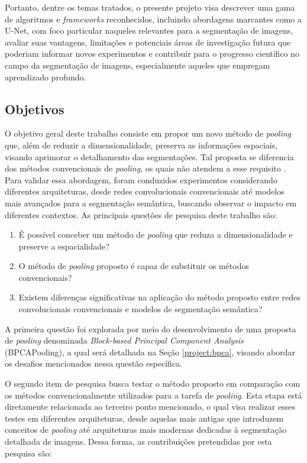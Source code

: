 Portanto, dentre os temas tratados, o presente projeto visa descrever uma gama de algoritmos e \textit{frameworks} reconhecidos, incluindo abordagens marcantes como a U-Net, com foco particular naqueles relevantes para a segmentação de imagens, avaliar suas vantagens, limitações e potenciais áreas de investigação futura que poderiam informar novos experimentos e contribuir para o progresso científico no campo da segmentação de imagens, especialmente aqueles que empregam aprendizado profundo.

\subsection{Objetivos}
\label{intro:objectives}
O objetivo geral deste trabalho consiste em propor um novo método de \textit{pooling} que, além de reduzir a dimensionalidade, preserva as informações espaciais, visando aprimorar o detalhamento das segmentações. Tal proposta se diferencia dos métodos convencionais de \textit{pooling}, os quais não atendem a esse requisito \citep{Liu2019Multi-LevelNetworks}. Para validar essa abordagem, foram conduzidos experimentos considerando diferentes arquiteturas, desde redes convolucionais convencionais até modelos mais avançados para a segmentação semântica, buscando observar o impacto em diferentes contextos. As principais questões de pesquisa deste trabalho são:

\begin{enumerate}
    \item É possível conceber um método de \textit{pooling} que reduza a dimensionalidade e preserve a espacialidade?
    \item O método de \textit{pooling} proposto é capaz de substituir os métodos convencionais?
    \item Existem diferenças significativas na aplicação do método proposto entre redes convolucionais convencionais e modelos de segmentação semântica?
\end{enumerate}

A primeira questão foi explorada por meio do desenvolvimento de uma proposta de \textit{pooling} denominada \textit{Block-based Principal Component Analysis} (BPCAPooling), a qual será detalhada na Seção \ref{project:bpca}, visando abordar os desafios mencionados nessa questão específica.

O segundo item de pesquisa busca testar o método proposto em comparação com os métodos convencionalmente utilizados para a tarefa de \textit{pooling}. Esta etapa está diretamente relacionada ao terceiro ponto mencionado, o qual visa realizar esses testes em diferentes arquiteturas, desde aquelas mais antigas que introduzem conceitos de \textit{pooling} até arquiteturas mais modernas dedicadas à segmentação detalhada de imagens. Dessa forma, as contribuições pretendidas por esta pesquisa são:

